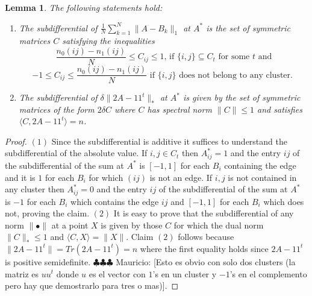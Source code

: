 \documentclass[12pt]{amsart}
\newtheorem{lemma}{Lemma}[section]
\numberwithin{equation}{section}
\newcommand{\mv}[1]{{\color{red} \sf $\clubsuit\clubsuit\clubsuit$ Mauricio: [#1]}}
\begin{document}
\begin{lemma} The following statements hold:
\label{lem: subdiff}
\begin{enumerate}
\item The subdifferential of $\frac{1}{N}\sum_{k=1}^N\|A-B_k\|_1$ at $A^*$ is the set of symmetric matrices $C$ satisfying the inequalities
\[ \frac{n_0(ij)-n_1(ij)}{N}\leq C_{ij}\leq 1 \text{, if $\{i,j\}\subseteq C_t$ for some $t$ and}\]
\[-1\leq C_{ij} \leq \frac{n_0(ij)-n_1(ij)}{N} \text{ if $\{i,j\}$ does not belong to any cluster. } \]
\item The subdifferential of $\delta\|2A-11^t\|_{*}$ at $A^*$ is given by the set of symmetric matrices of the form $2\delta C$ where $C$ has spectral norm $\|C\|\leq 1$ and satisfies $\langle C, 2A-11^t\rangle = n$.

\end{enumerate}

\end{lemma}
\begin{proof} $(1)$ Since the subdifferential is additive it suffices to understand the subdifferential of the absolute value. If $i,j\in C_t$ then $A^*_{ij}=1$ and the entry $ij$ of the subdifferential of the sum at $A^*$ is $[-1,1]$ for each $B_i$ containing the edge and it is $1$ for each $B_i$ for which $(ij)$ is not an edge. If $i,j$ is not contained in any cluster then $A^*_{ij}=0$ and the entry $ij$ of the subdifferential of the sum at $A^*$ is $-1$ for each $B_i$ which contains the edge $ij$ and $[-1,1]$ for each $B_i$ which does not, proving the claim. $(2)$ It is easy to prove that the subdifferential of any norm $\|\bullet\|$ at a point $X$ is given by those $C$ for which the dual norm $\|C\|_*\leq 1$ and $\langle C,X\rangle =\|X\|$. Claim $(2)$ follows because $\|2A-11^t\|=Tr(2A-11^t)=n$ where the first equality holds since $2A-11^t$ is positive semidefinite.\mv{Esto es obvio con solo dos clusters (la matriz es $uu^t$ donde $u$ es el vector con $1$'s en un cluster y $-1$'s en el complemento pero hay que demostrarlo para tres o mas)}.
\end{proof}
\end{document}
